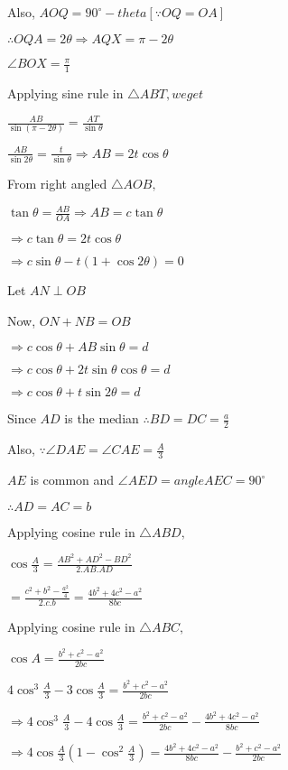   Also, $AOQ = 90^\circ - theta[\because OQ = OA]$

  $\therefore OQA = 2\theta \Rightarrow AQX = \pi - 2\theta$

  $\angle BOX = \frac{\pi}{1}$

  Applying sine rule in $\triangle ABT, we get$

  $\frac{AB}{\sin(\pi - 2\theta)} = \frac{AT}{\sin\theta}$

  $\frac{AB}{\sin2\theta} = \frac{t}{\sin\theta} \Rightarrow AB = 2t\cos\theta$

  From right angled $\triangle AOB,$

  $\tan\theta = \frac{AB}{OA} \Rightarrow AB = c\tan\theta$

  $\Rightarrow c\tan\theta = 2t\cos\theta$

  $\Rightarrow c\sin\theta - t(1 + \cos2\theta) = 0$

  Let $AN\perp OB$

  Now, $ON + NB = OB$

  $\Rightarrow c\cos\theta + AB\sin\theta = d$

  $\Rightarrow c\cos\theta + 2t\sin\theta\cos\theta = d$

  $\Rightarrow c\cos\theta + t\sin2\theta = d$

\item Since $AD$ is the median $\therefore BD = DC = \frac{a}{2}$

  Also, $\because \angle DAE = \angle CAE = \frac{A}{3}$

  $AE$ is common and $\angle AED = angle AEC = 90^\circ$

  $\therefore AD = AC = b$

  Applying cosine rule in $\triangle ABD,$

  $\cos\frac{A}{3} = \frac{AB^2 + AD^2 - BD^2}{2.AB.AD}$

  $= \frac{c^2 + b^2 - \frac{a^2}{4}}{2.c.b} = \frac{4b^2 + 4c^2 - a^2}{8bc}$

  Applying cosine rule in $\triangle ABC,$

  $\cos A = \frac{b^2 + c^2 - a^2}{2bc}$

  $4\cos^3\frac{A}{3} - 3\cos\frac{A}{3} = \frac{b^2 + c^2 - a^2}{2bc}$

  $\Rightarrow 4\cos^3\frac{A}{3} - 4\cos\frac{A}{3} = \frac{b^2 + c^2 - a^2}{2bc} - \frac{4b^2 + 4c^2 - a^2}{8bc}$

  $\Rightarrow 4\cos\frac{A}{3}\left(1 - \cos^2\frac{A}{3}\right) = \frac{4b^2 + 4c^2 - a^2}{8bc} - \frac{b^2 + c^2 -
    a^2}{2bc}$

